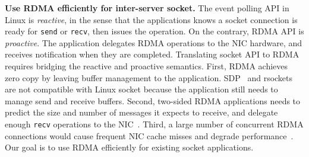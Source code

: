 \textbf{Use RDMA efficiently for inter-server socket.}
The event polling API in Linux is \textit{reactive}, in the sense that the applications knows a socket connection is ready for \texttt{send} or \texttt{recv}, then issues the operation.
On the contrary, RDMA API is \textit{proactive}. The application delegates RDMA operations to the NIC hardware, and receives notification when they are completed.
Translating socket API to RDMA requires bridging the reactive and proactive semantics.
First, RDMA achieves zero copy by leaving buffer management to the application. SDP~\cite{socketsdirect} and rsockets~\cite{rsockets} are not compatible with Linux socket because the application still needs to manage send and receive buffers.
Second, two-sided RDMA applications needs to predict the size and number of messages it expects to receive, and delegate enough \texttt{recv} operations to the NIC~\cite{huang2017high}.
Third, a large number of concurrent RDMA connections would cause frequent NIC cache misses and degrade performance~\cite{mprdma,kaminsky2016design}.
Our goal is to use RDMA efficiently for existing socket applications.
